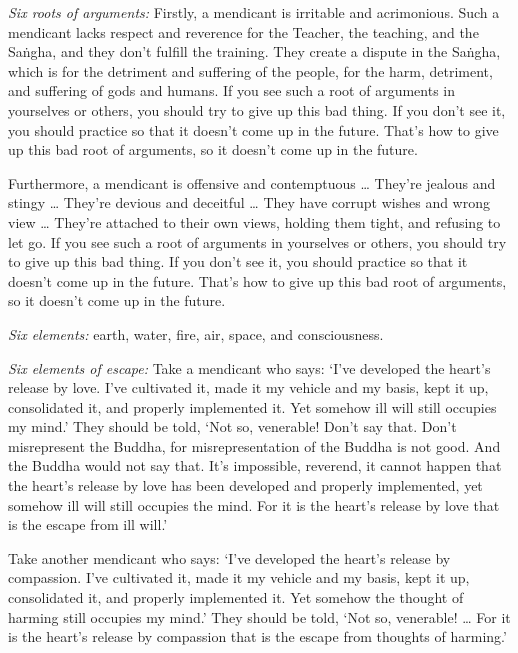 \documentclass[12pt,openany]{book}%
\begin{document}
\emph{Six roots of arguments:} Firstly, a mendicant is irritable and acrimonious. Such a mendicant lacks respect and reverence for the Teacher, the teaching, and the \textsanskrit{Saṅgha}, and they don’t fulfill the training. They create a dispute in the \textsanskrit{Saṅgha}, which is for the detriment and suffering of the people, for the harm, detriment, and suffering of gods and humans. If you see such a root of arguments in yourselves or others, you should try to give up this bad thing. If you don’t see it, you should practice so that it doesn’t come up in the future. That’s how to give up this bad root of arguments, so it doesn’t come up in the future. 

Furthermore, a mendicant is offensive and contemptuous … They’re jealous and stingy … They’re devious and deceitful … They have corrupt wishes and wrong view … They’re attached to their own views, holding them tight, and refusing to let go. If you see such a root of arguments in yourselves or others, you should try to give up this bad thing. If you don’t see it, you should practice so that it doesn’t come up in the future. That’s how to give up this bad root of arguments, so it doesn’t come up in the future. 

\emph{Six elements:} earth, water, fire, air, space, and consciousness. 

\emph{Six elements of escape:} Take a mendicant who says: ‘I’ve developed the heart’s release by love. I’ve cultivated it, made it my vehicle and my basis, kept it up, consolidated it, and properly implemented it. Yet somehow ill will still occupies my mind.’ They should be told, ‘Not so, venerable! Don’t say that. Don’t misrepresent the Buddha, for misrepresentation of the Buddha is not good. And the Buddha would not say that. It’s impossible, reverend, it cannot happen that the heart’s release by love has been developed and properly implemented, yet somehow ill will still occupies the mind. For it is the heart’s release by love that is the escape from ill will.’ 

Take another mendicant who says: ‘I’ve developed the heart’s release by compassion. I’ve cultivated it, made it my vehicle and my basis, kept it up, consolidated it, and properly implemented it. Yet somehow the thought of harming still occupies my mind.’ They should be told, ‘Not so, venerable! … For it is the heart’s release by compassion that is the escape from thoughts of harming.’ 
\end{document}
